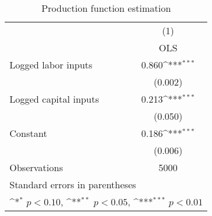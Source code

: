 \begin{table}[htbp]\centering
\def\sym#1{\ifmmode^{#1}\else\(^{#1}\)\fi}
\caption{Production function estimation}
\begin{tabular}{l*{1}{c}}
\hline\hline
                &\multicolumn{1}{c}{(1)}\\
                &\multicolumn{1}{c}{OLS}\\
\hline
Logged labor inputs&    0.860\sym{***}\\
                &  (0.002)         \\
Logged capital inputs&    0.213\sym{***}\\
                &  (0.050)         \\
Constant        &    0.186\sym{***}\\
                &  (0.006)         \\
\hline
Observations    &     5000         \\
\hline\hline
\multicolumn{2}{l}{\footnotesize Standard errors in parentheses}\\
\multicolumn{2}{l}{\footnotesize \sym{*} \(p<0.10\), \sym{**} \(p<0.05\), \sym{***} \(p<0.01\)}\\
\end{tabular}
\end{table}
